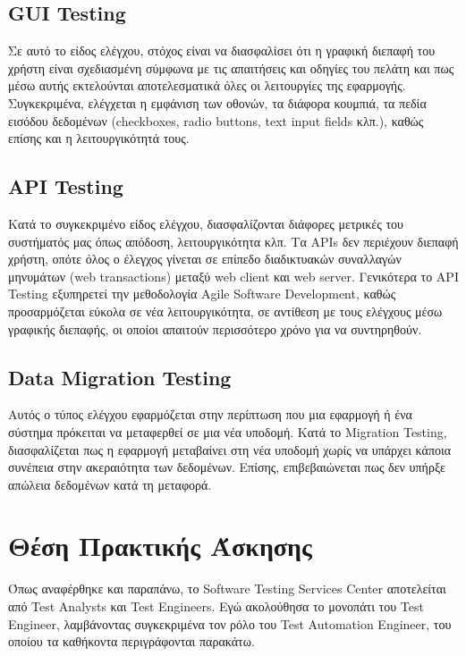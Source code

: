 \subsection*{GUI Testing}
Σε αυτό το είδος ελέγχου, στόχος είναι να διασφαλίσει ότι η γραφική διεπαφή του χρήστη είναι σχεδιασμένη σύμφωνα με τις απαιτήσεις και οδηγίες 
του πελάτη και πως μέσω αυτής εκτελούνται αποτελεσματικά όλες οι λειτουργίες της εφαρμογής. Συγκεκριμένα, ελέγχεται η εμφάνιση των οθονών, τα 
διάφορα κουμπιά, τα πεδία εισόδου δεδομένων (checkboxes, radio buttons, text input fields κλπ.), καθώς επίσης και η λειτουργικότητά τους.

\subsection*{API Testing}
Κατά το συγκεκριμένο είδος ελέγχου, διασφαλίζονται διάφορες μετρικές του συστήματός μας όπως απόδοση, λειτουργικότητα κλπ. Τα APIs δεν 
περιέχουν διεπαφή χρήστη, οπότε όλος ο έλεγχος γίνεται σε επίπεδο διαδικτυακών συναλλαγών μηνυμάτων (web transactions) μεταξύ web client και 
web server. Γενικότερα το API Testing εξυπηρετεί την μεθοδολογία Agile Software Development, καθώς προσαρμόζεται εύκολα σε νέα λειτουργικότητα, 
σε αντίθεση με τους ελέγχους μέσω γραφικής διεπαφής, οι οποίοι απαιτούν περισσότερο χρόνο για να συντηρηθούν.

\subsection*{Data Migration Testing}
Αυτός ο τύπος ελέγχου εφαρμόζεται στην περίπτωση που μια εφαρμογή ή ένα σύστημα πρόκειται να μεταφερθεί σε μια νέα υποδομή. Κατά το Migration 
Testing, διασφαλίζεται πως η εφαρμογή μεταβαίνει στη νέα υποδομή χωρίς να υπάρχει κάποια συνέπεια στην ακεραιότητα των δεδομένων. Επίσης, 
επιβεβαιώνεται πως δεν υπήρξε απώλεια δεδομένων κατά τη μεταφορά.

\section*{Θέση Πρακτικής Άσκησης}
Όπως αναφέρθηκε και παραπάνω, το Software Testing Services Center αποτελείται από Test Analysts και Test Engineers. Εγώ ακολούθησα το μονοπάτι του Test Engineer, λαμβάνοντας συγκεκριμένα τον ρόλο του Test Automation Engineer, του οποίου τα καθήκοντα περιγράφονται παρακάτω.\\

